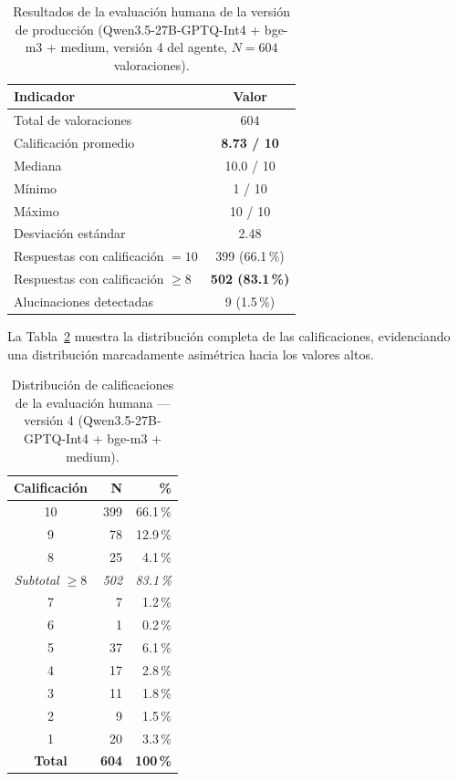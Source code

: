 \begin{table}[H]
\centering
\begin{tabular}{|l|c|}
\hline
\textbf{Indicador} & \textbf{Valor} \\
\hline
Total de valoraciones              & 604 \\
Calificación promedio              & \textbf{8.73 / 10} \\
Mediana                            & 10.0 / 10 \\
Mínimo                             & 1 / 10 \\
Máximo                             & 10 / 10 \\
Desviación estándar                & 2.48 \\
Respuestas con calificación $= 10$ & 399 (66.1\,\%) \\
Respuestas con calificación $\geq 8$ & \textbf{502 (83.1\,\%)} \\
Alucinaciones detectadas           & 9 (1.5\,\%) \\
\hline
\end{tabular}
\caption{Resultados de la evaluación humana de la versión de producción (Qwen3.5-27B-GPTQ-Int4 + bge-m3 + medium, versión 4 del agente, $N = 604$ valoraciones).}
\label{tab:eval-humana-v5}
\end{table}

La Tabla~\ref{tab:distribucion-calificaciones} muestra la distribución completa de las calificaciones, evidenciando una distribución marcadamente asimétrica hacia los valores altos.

\begin{table}[H]
\centering
\begin{tabular}{|c|r|r|}
\hline
\textbf{Calificación} & \textbf{N} & \textbf{\%} \\
\hline
10 & 399 & 66.1\,\% \\
9  &  78 & 12.9\,\% \\
8  &  25 &  4.1\,\% \\
\hline
\textit{Subtotal $\geq 8$} & \textit{502} & \textit{83.1\,\%} \\
\hline
7  &   7 &  1.2\,\% \\
6  &   1 &  0.2\,\% \\
5  &  37 &  6.1\,\% \\
4  &  17 &  2.8\,\% \\
3  &  11 &  1.8\,\% \\
2  &   9 &  1.5\,\% \\
1  &  20 &  3.3\,\% \\
\hline
\textbf{Total} & \textbf{604} & \textbf{100\,\%} \\
\hline
\end{tabular}
\caption{Distribución de calificaciones de la evaluación humana — versión 4 (Qwen3.5-27B-GPTQ-Int4 + bge-m3 + medium).}
\label{tab:distribucion-calificaciones}
\end{table}

